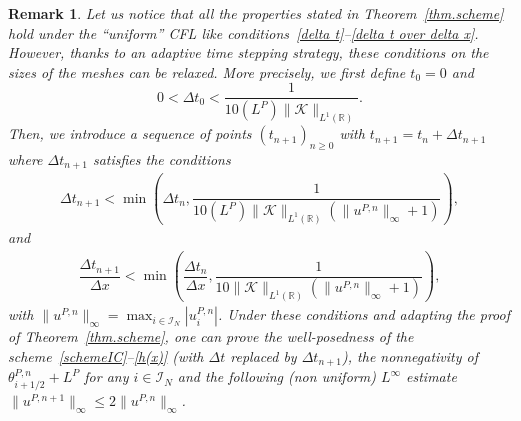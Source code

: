 \documentclass[11pt]{amsart}
\newtheorem{remark}{Remark}
\newcommand{\K}{\mathcal{K}}
\newcommand{\R}{\mathbb{R}}
\newcommand{\I}{\mathcal{I}_N}
\begin{document}
\begin{remark}
Let us notice that all the properties stated in Theorem~\ref{thm.scheme} hold under the ``uniform'' CFL like conditions~\eqref{delta t}--\eqref{delta t over delta x}. However, thanks to an adaptive time stepping strategy, these conditions on the sizes of the meshes can be relaxed. More precisely, we first define $t_0 = 0$ and
\[
0< \Delta t_0 < \dfrac{1}{10 (L^P) \|\K\|_{L^1(\R)}}.
\]
Then, we introduce a sequence of points $(t_{n+1})_{n\geq 0}$ with $t_{n+1} = t_n + \Delta t_{n+1}$ where $\Delta t_{n+1}$ satisfies the conditions
\begin{align*}
\Delta t_{n+1} < \min\left(\Delta t_n, \dfrac{1}{10 (L^P) \|\K\|_{L^1(\R)} \left(\|u^{P,n}\|_\infty+1\right)}\right),
\end{align*}
and
\begin{align*}
\dfrac{\Delta t_{n+1}}{\Delta x} < \min\left(\dfrac{\Delta t_n}{\Delta x}, \dfrac{1}{10 \|\K\|_{L^1(\R)} \left(\|u^{P,n}\|_\infty+1\right)}\right),
\end{align*}
with $\|u^{P,n}\|_\infty = \max_{i \in \I} |u^{P,n}_i|$. Under these conditions and adapting the proof of Theorem~\ref{thm.scheme}, one can prove the well-posedness of the scheme~\eqref{schemeIC}--\eqref{h(x)} (with $\Delta t$ replaced by $\Delta t_{n+1}$), the nonnegativity of $\theta^{P,n}_{i+1/2}+L^P$ for any $i \in \I$ and the following (non uniform) $L^\infty$ estimate $\|u^{P,n+1}\|_\infty \leq 2 \|u^{P,n}\|_\infty$.
\end{remark}
\end{document}
